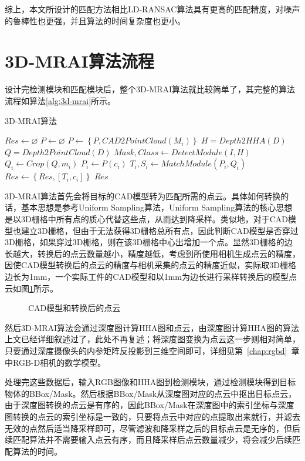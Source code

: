 综上，本文所设计的匹配方法相比LD-RANSAC算法具有更高的匹配精度，对噪声的鲁棒性也更强，并且算法的时间复杂度也更小。

\section{3D-MRAI算法流程}
设计完检测模块和匹配模块后，整个3D-MRAI算法就比较简单了，其完整的算法流程如算法\ref{alg:3d-mrai}所示。
\begin{algorithm}
  \caption{3D-MRAI算法}
  \label{alg:3d-mrai}
  $Res\leftarrow \varnothing$\;
  $P\leftarrow \varnothing$\;
   {
    $P\leftarrow \left\{P, CAD2PointCloud(M_i)\right\}$\;
  }
  $H = Depth2HHA(D)$\;
  $Q = Depth2PointCloud(D)$\;
  $Mask, Class \leftarrow DetectModule(I, H)$\;
   {
    $Q_i \leftarrow Crop(Q, m_i)$\;
    $P_i \leftarrow P(c_i)$\;
    $T_i,S_i\leftarrow MatchModule(P_i, Q_i)$\;
     {
      $Res\leftarrow \left\{Res, \left[T_i, c_i\right]\right\}$\;
    }
  }
  \Return $Res$
\end{algorithm}

3D-MRAI算法首先会将目标的CAD模型转为匹配所需的点云。具体如何转换的话，基本思想是参考Uniform Sampling算法，Uniform Sampling算法的核心思想是以3D栅格中所有点的质心代替这些点，从而达到降采样。类似地，对于CAD模型也建立3D栅格，但由于无法获得3D栅格总所有点，因此判断CAD模型是否穿过3D栅格，如果穿过3D栅格，则在该3D栅格中心出增加一个点。显然3D栅格的边长越大，转换后的点云数量越小，精度越低，考虑到所使用相机生成点云的精度，因使CAD模型转换后的点云的精度与相机采集的点云的精度近似，实际取3D栅格边长为1mm，一个实际工件的CAD模型和以1mm为边长进行采样转换后的模型点云如图\ref{fig:model-pc}所示。
\begin{figure}[ht]
  \centering
  \hskip1cm
  \caption{CAD模型和转换后的点云}
  \label{fig:model-pc}
\end{figure}

然后3D-MRAI算法会通过深度图计算HHA图和点云，由深度图计算HHA图的算法上文已经详细叙述过了，此处不再复述；将深度图变换为点云这一步则相对简单，只要通过深度摄像头的内参矩阵反投影到三维空间即可，详细见第~\ref{chap:rgbd}~章中RGB-D相机的数学模型。

处理完这些数据后，输入RGB图像和HHA图到检测模块，通过检测模块得到目标物体的BBox/Mask。然后根据BBox/Mask从深度图对应的点云中抠出目标点云，由于深度图转换的点云是有序的，因此BBox/Mask在深度图中的索引坐标与深度图转换的点云的索引坐标是一致的，只要将点云中对应的点提取出来就行，并滤去无效的点然后适当降采样即可，尽管滤波和降采样之后的目标点云是无序的，但后续匹配算法并不需要输入点云有序，而且降采样后点云数量减少，将会减少后续匹配算法的时间。


